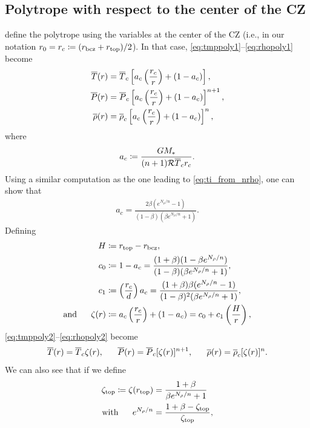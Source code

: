 \documentclass[12pt]{article}
\numberwithin{equation}{section}
\newcommand{\nrho}{N_\rho}
\begin{document}
\subsection{Polytrope with respect to the center of the CZ}
\citet{Jones2011} define the polytrope using the variables at the center of the CZ (i.e., in our notation $r_0=r_c\coloneqq(r_{\rm{bcz}}+r_{\rm{top}})/2$). In that case, \eqref{eq:tmppoly1}--\eqref{eq:rhopoly1} become
\begin{align}
	\overline{T}(r) &= \overline{T}_c\left[a_c\left(\frac{r_c}{r}\right) + (1 - a_c)\right],\label{eq:tmppoly2}\\
	\overline{P}(r) &= \overline{P}_c\left[a_c\left(\frac{r_c}{r}\right) + (1 - a_c)\right]^{n+1},\label{eq:ppoly2}\\
	\overline{\rho}(r) &= \overline{\rho}_c\left[a_c\left(\frac{r_c}{r}\right) + (1 - a_c)\right]^n,\label{eq:rhopoly2}
\end{align} 
where 
\begin{align}
a_c \coloneqq \frac{GM_*}{(n+1)\mathcal{R} \overline{T}_c r_c}.
\label{eq:ac}
\end{align}
Using a similar computation as the one leading to \eqref{eq:ti_from_nrho}, one can show that 
\begin{align}
a_c = \frac{2\beta(e^{\nrho/n}-1)}{(1-\beta)(\beta e^{\nrho/n} + 1)}.
\label{eq:ac_fromn}
\end{align}
Defining 
\begin{align}
H&\define r\topp-r\bcz,\label{eq:d}\\
c_0&\define 1-a_c = \frac{(1+\beta)(1-\beta e^{\nrho/n})}{(1-\beta)(\beta e^{\nrho/n} + 1)}, \label{eq:c0}\\
c_1&\define \left(\frac{r_c}{d}\right)a_c = \frac{(1+\beta)\beta(e^{\nrho/n}-1)}{(1-\beta)^2(\beta e^{\nrho/n} + 1)},\label{eq:c1}\\
\andd \zeta(r) &\define a_c\left(\frac{r_c}{r}\right) + (1-a_c) = c_0 + c_1\left(\frac{H}{r}\right),\label{eq:zeta}
\end{align}
\eqref{eq:tmppoly2}--\eqref{eq:rhopoly2} become
\begin{align}
\tmpref\ofr=\tmpref_c\zeta(r),\ \ \ \ \ \prsref\ofr=\prsref_c[\zeta(r)]^{n+1},\ \ \ \ \ \rhoref\ofr=\rhoref_c[\zeta(r)]^n. 
\label{eq:polytrope3}
\end{align}
We can also see that if we define
\begin{subequations}
\begin{align}
\zeta\topp \define \zeta(r\topp) &= \frac{1+\beta}{\beta e^{\nrho/n} + 1}\\
\with e^{\nrho/n}&=\frac{1+\beta-\zeta\topp}{\zeta\topp},
\end{align}
\end{subequations}
\end{document}
